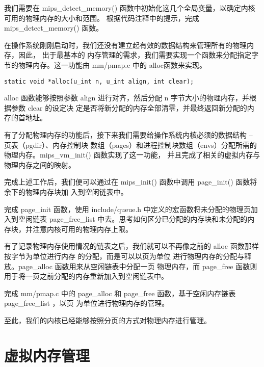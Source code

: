 \begin{exercise}
我们需要在 mips\_detect\_memory() 函数中初始化这几个全局变量，以确定内核可用的物理内存的大小和范围。
根据代码注释中的提示，完成 mips\_detect\_memory() 函数。
\end{exercise}

在操作系统刚刚启动时，我们还没有建立起有效的数据结构来管理所有的物理内存，因此， 出于最基本的
内存管理的需求，我们需要实现一个函数来分配指定字节的物理内存。这一功能由 mm/pmap.c 中的 
alloc函数来实现。

\begin{verbatim}
static void *alloc(u_int n, u_int align, int clear);
\end{verbatim}

alloc 函数能够按照参数 align 进行对齐，然后分配 n 字节大小的物理内存，并根据参数 clear 的设定决
定是否将新分配的内存全部清零，并最终返回新分配的内存的首地址。

有了分配物理内存的功能后，接下来我们需要给操作系统内核必须的数据结构 -- 页表（pgdir）、内存控制块
数组（pages）和进程控制块数组（envs）分配所需的物理内存。mips\_vm\_init() 函数实现了这一功能，
并且完成了相关的虚拟内存与物理内存之间的映射。

完成上述工作后，我们便可以通过在 mips\_init() 函数中调用 page\_init() 函数将余下的物理内存块加
入到空闲链表中。

\begin{exercise}
完成 page\_init 函数，使用 include/queue.h 中定义的宏函数将未分配的物理页加入到空闲链表 
page\_free\_list 中去。思考如何区分已分配的内存块和未分配的内存块，并注意内核可用的物理内存上限。
\end{exercise}

有了记录物理内存使用情况的链表之后，我们就可以不再像之前的 alloc 函数那样按字节为单位进行内存
的分配，而是可以以页为单位 进行物理内存的分配与释放。page\_alloc 函数用来从空闲链表中分配一页
物理内存，而 page\_free 函数则用于将一页之前分配的内存重新加入到空闲链表中。

\begin{exercise}
完成 mm/pmap.c 中的 page\_alloc 和 page\_free 函数，基于空闲内存链表 page\_free\_list ，以页
为单位进行物理内存的管理。
\end{exercise}

至此，我们的内核已经能够按照分页的方式对物理内存进行管理。

\section{虚拟内存管理}

